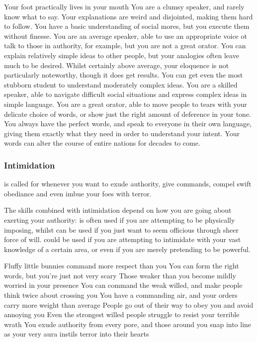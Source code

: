 \ratingTable
{Your foot practically lives in your mouth}
{You are a clumsy speaker, and rarely know what to say. Your explanations are weird and disjointed, making them hard to follow.}
{You have a basic understanding of social mores, but you execute them without finesse. }
{You are an average speaker, able to use an appropriate voice ot talk to those in authority, for example, but you are not a great orator. You can explain relatively simple ideas to other people, but your analogies often leave much to be desired. }
{Whilst certainly above average, your eloquence is not particularly noteworthy, though it does get results. You can get even the most stubborn student to understand moderately complex ideas.}
{You are a skilled speaker, able to navigate difficult social situations and express complex ideas in simple language.}
{You are a great orator, able to move people to tears with your delicate choice of words, or show just the right amount of deference in your tone.}
{You always have the perfect words, and speak to everyone in their own language, giving them exactly what they need in order to understand your intent. Your words can alter the course of entire nations for decades to come.}

\subsubsection{Intimidation}

 is called for whenever you want to exude authority, give commands, compel swift obediance and even imbue your foes with terror. 

The skills combined with intimidation depend on how you are going about exerting your authority:  is often used if you are attempting to be physically imposing, whilst  can be used if you just want to seem officious through sheer force of will.  could be used if you are attempting to intimidate with your vast knowledge of a certain area, or even  if you are merely pretending to be powerful. 

\ratingTable
{Fluffy little bunnies command more respect than you}
{You can form the right words, but you're just not very scary}
{Those weaker than you become mildly worried in your presence}
{You can command the weak willed, and make people think twice about crossing you}
{You have a commanding air, and your orders carry more weight than average}
{People go out of their way to obey you and avoid annoying you}
{Even the strongest willed people struggle to resist your terrible wrath}
{You exude authority from every pore, and those around you snap into line as your very aura instils terror into their hearts}


